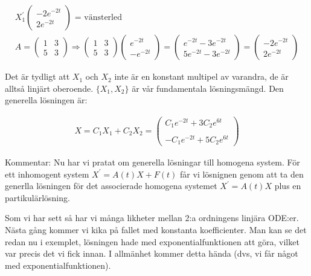 \begin{equation*}
  \begin{gathered}
    X_1^{\prime}\begin{pmatrix}-2e^{-2t}\\2e^{-2t}\end{pmatrix}\text{ = vänsterled}\\
    A = \begin{pmatrix}1&3\\5&3\end{pmatrix}\Rightarrow \begin{pmatrix}1&3\\5&3\end{pmatrix}\begin{pmatrix}e^{-2t}\\-e^{-2t}\end{pmatrix} = \begin{pmatrix}e^{-2t}-3e^{-2t}\\5e^{-2t}-3e^{-2t}\end{pmatrix} = \begin{pmatrix}-2e^{-2t}\\2e^{-2t}\end{pmatrix}
  \end{gathered}
\end{equation*}
\par\bigskip
\noindent Det är tydligt att $X_1$ och $X_2$ inte är en konstant multipel av varandra, de är alltså linjärt oberoende. $\{X_1,X_2\}$ är vår fundamentala lösningsmängd. Den generella lösningen är:

\begin{equation*}
  \begin{gathered}
    X = C_1X_1+C_2X_2 = \begin{pmatrix}C_1e^{-2t}+3C_2e^{6t}\\\\-C_1e^{-2t}+5C_2e^{6t}\end{pmatrix}
  \end{gathered}
\end{equation*}
\par\bigskip
\noindent Kommentar: Nu har vi pratat om generella lösningar till homogena system. För ett inhomogent system $X^{\prime} = A(t)X+F(t)$ får vi lösnignen genom att ta den generlla lösningen för det associerade homogena systemet $X^{\prime} = A(t)X$ plus en partikulärlösning.
\par\bigskip
\noindent Som vi har sett så har vi många likheter mellan 2:a ordningens linjära ODE:er. Nästa gång kommer vi kika på fallet med konstanta koefficienter. Man kan se det redan nu i exemplet, lösningen hade med exponentialfunktionen att göra, vilket var precis det vi fick innan. I allmänhet kommer detta hända (dvs, vi får något med exponentialfunktionen). 
